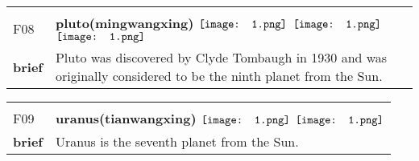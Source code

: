 \documentclass[UTF8]{article}
\begin{document}
            \begin{tabularx}{\textwidth}{p{1.5cm}X}
            \arrayrulecolor{myBlue}
        	\hline\\
            \small{F08}&
            \large{\bfseries{pluto(mingwangxing)}}\hfill
                                                            \phantom{$\vcenter{\hbox{\texttt{[image: 1.png]}}}$}
                                                                \phantom{$\vcenter{\hbox{\texttt{[image: 1.png]}}}$}
                                                                $\vcenter{\hbox{\texttt{[image: 1.png]}}}$
                                                                \phantom{$\vcenter{\hbox{\texttt{[image: 1.png]}}}$}
                                                                $\vcenter{\hbox{\texttt{[image: 1.png]}}}$
                                                                $\vcenter{\hbox{\texttt{[image: 1.png]}}}$
                                                                \phantom{$\vcenter{\hbox{\texttt{[image: 1.png]}}}$}
                                        \\[10pt]
            \large{\bfseries{brief}}&\noindent\parbox[c]{\hsize}{Pluto was discovered by Clyde Tombaugh in 1930 and was originally considered to be the ninth planet from the Sun.} \\[5pt]
            \hline\\[-10pt]
        \end{tabularx}
            \begin{tabularx}{\textwidth}{p{1.5cm}X}
            \arrayrulecolor{myBlue}
        	\hline\\
            \small{F09}&
            \large{\bfseries{uranus(tianwangxing)}}\hfill
                                                            \phantom{$\vcenter{\hbox{\texttt{[image: 1.png]}}}$}
                                                                $\vcenter{\hbox{\texttt{[image: 1.png]}}}$
                                                                $\vcenter{\hbox{\texttt{[image: 1.png]}}}$
                                                                \phantom{$\vcenter{\hbox{\texttt{[image: 1.png]}}}$}
                                                                \phantom{$\vcenter{\hbox{\texttt{[image: 1.png]}}}$}
                                                                \phantom{$\vcenter{\hbox{\texttt{[image: 1.png]}}}$}
                                                                \phantom{$\vcenter{\hbox{\texttt{[image: 1.png]}}}$}
                                        \\[10pt]
            \large{\bfseries{brief}}&\noindent\parbox[c]{\hsize}{Uranus is the seventh planet from the Sun.} \\[5pt]
            \hline\\[-10pt]
        \end{tabularx}
\end{document}
